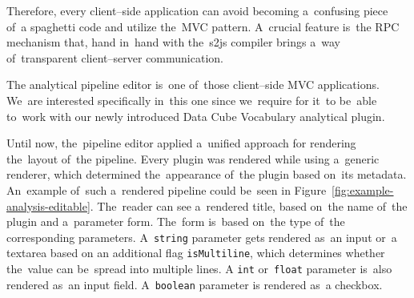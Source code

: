 Therefore, every client--side application can avoid becoming a~confusing piece of~a
spaghetti code and utilize the~MVC pattern. A~crucial feature is~the RPC 
mechanism that, hand in~hand with the~s2js compiler brings a~way of~transparent 
client--server communication.

The analytical pipeline editor is~one of~those client--side MVC applications. We~are interested specifically in~this one since we~require for it~to be~able to~work 
with our newly introduced Data Cube Vocabulary analytical plugin.

Until now, the~pipeline editor applied a~unified approach for rendering the~layout of~the pipeline. Every plugin was rendered while using a~generic 
renderer, which determined the~appearance of~the plugin based on~its metadata. An~example of~such a~rendered pipeline could be~seen in
Figure~\ref{fig:example-analysis-editable}. The~reader can see a~rendered title, based on~the name of~the plugin and a~parameter form. The~form is~based on~the type of~the 
corresponding parameters. A~\texttt{string} parameter gets rendered as~an input or~a textarea based on
an additional flag \texttt{isMultiline}, which determines whether the~value can be~spread into multiple lines.
A \texttt{int} or~\texttt{float} parameter is~also rendered as~an input field. A~\texttt{boolean} parameter 
is rendered as~a checkbox.

